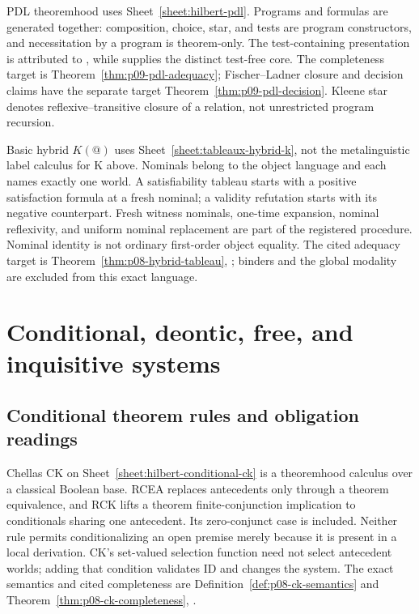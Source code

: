 PDL theoremhood uses Sheet~\ref{sheet:hilbert-pdl}.  Programs and formulas
are generated together: composition, choice, star, and tests are program
constructors, and necessitation by a program is theorem-only.  The
test-containing presentation is attributed to
\cite{HarelKozenTiuryn2000}, while \cite{KozenParikh1981} supplies the distinct
test-free core.  The completeness target is
Theorem~\ref{thm:p09-pdl-adequacy}; Fischer--Ladner closure and decision
claims have the separate target Theorem~\ref{thm:p09-pdl-decision}.  Kleene
star denotes reflexive--transitive closure of a relation, not unrestricted
program recursion.

Basic hybrid \(K(@)\) uses Sheet~\ref{sheet:tableaux-hybrid-k}, not the
metalinguistic label calculus for K above.  Nominals belong to the
object language and each names exactly one world.  A satisfiability tableau
starts with a positive satisfaction formula at a fresh nominal; a validity
refutation starts with its negative counterpart.  Fresh witness nominals,
one-time expansion, nominal reflexivity, and uniform nominal replacement
are part of the registered procedure.  Nominal identity is not ordinary
first-order object equality.  The cited adequacy target is
Theorem~\ref{thm:p08-hybrid-tableau}, \cite{ArecesTenCate2007}; binders and
the global modality are excluded from this exact language.


\section{Conditional, deontic, free, and inquisitive systems}
\label{sec:p14-nonclassical-conditional-inquisitive}

\subsection{Conditional theorem rules and obligation readings}

Chellas CK on Sheet~\ref{sheet:hilbert-conditional-ck} is a theoremhood
calculus over a classical Boolean base.  RCEA replaces antecedents only
through a theorem equivalence, and RCK lifts a theorem finite-conjunction
implication to conditionals sharing one antecedent.  Its zero-conjunct case
is included.  Neither rule permits conditionalizing an open premise merely
because it is present in a local derivation.  CK's set-valued selection
function need not select antecedent worlds; adding that condition validates
ID and changes the system.  The exact semantics and cited completeness
are Definition~\ref{def:p08-ck-semantics} and
Theorem~\ref{thm:p08-ck-completeness}, \cite{Chellas1975}.

